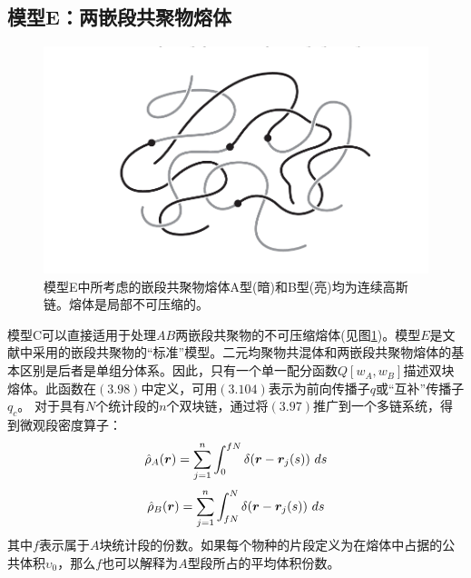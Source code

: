 \subsection{模型E：两嵌段共聚物熔体}

\begin{figure}[H]
	\centering   
	\includegraphics[width=12cm]{./figures/2.png}
	\caption{模型E中所考虑的嵌段共聚物熔体A型(暗)和B型(亮)均为连续高斯链。熔体是局部不可压缩的。}
	\label{模型E}
\end{figure}
模型C可以直接适用于处理$AB$两嵌段共聚物的不可压缩熔体(见图\ref{模型E})。模型$E$是文献中采用的嵌段共聚物的“标准”模型。二元均聚物共混体和两嵌段共聚物熔体的基本区别是后者是单组分体系。因此，只有一个单一配分函数$Q[w_{A},w_{B}]$描述双块熔体。此函数在$(3.98)$中定义，可用$(3.104)$表示为前向传播子$q$或“互补”传播子$q_{c}$。 对于具有$N$个统计段的$n$个双块链，通过将$(3.97)$推广到一个多链系统，得到微观段密度算子：\\
\begin{equation}
\hat{ \rho }_{A}(\bm{r})=\sum_{j=1}^{n} \int _{0}^{fN}  \delta (\bm{r}-\bm{r}_{j}(s))~d s
\end{equation}
\begin{equation}
\hat{ \rho }_{B}(\bm{r})=\sum_{j=1}^{n} \int _{fN}^{N} \delta (\bm{r}-\bm{r}_{j}(s))~d s 
\end{equation}
其中$f$表示属于$A$块统计段的份数。如果每个物种的片段定义为在熔体中占据的公共体积$\upsilon_0$，那么$f$也可以解释为$A$型段所占的平均体积份数。\\

